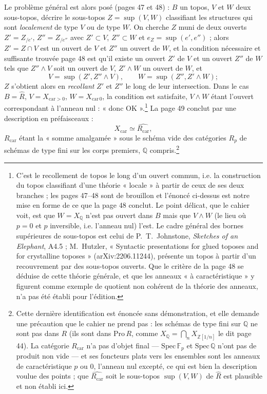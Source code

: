 \documentclass[11pt,a4paper]{article}
\begin{document}
Le problème général est alors posé (pages 47 et 48) : $B$ un topos, $V$ et
$W$ deux sous-topos, décrire le sous-topos $Z = \sup(V, W)$ classifiant les
structures qui sont \emph{localement} de type $V$ ou de type $W$. On
cherche $Z$ muni de deux ouverts $Z' = Z_{/e'}$, $Z'' = Z_{/e''}$ avec $Z' \subset
V$, $Z'' \subset W$ et $e_{Z} = \sup(e', e'')$ ; alors $Z' = Z \cap V$ est un
ouvert de $V$ et $Z''$ un ouvert de $W$, et la condition nécessaire et
suffisante trouvée page 48 est qu'il existe un ouvert $Z'$ de $V$ et un
ouvert $Z''$ de $W$ tels que $Z'' \wedge V$ soit un ouvert de $V$, $Z' \wedge
W$ un ouvert de $W$, et
\[
V = \sup(Z', Z'' \wedge V), \qquad W = \sup(Z'', Z' \wedge W) ;
\]
$Z$ s'obtient alors en \emph{recollant} $Z'$ et $Z''$ le long de leur
intersection. Dans le cas $B = \widehat{R}$, $V = X_{\mathrm{car} > 0}$, $W =
X_{\mathrm{car}\,0}$, la condition est satisfaite, $V \wedge W$ étant l'ouvert
correspondant à l'anneau nul : « donc OK ».\footnote{C'est le recollement
de topos le long d'un ouvert commun, i.e. la construction du topos
classifiant d'une théorie « locale » à partir de ceux de ses deux
branches ; les pages 47--48 sont de brouillon et l'énoncé ci-dessus est
notre mise en forme de ce que la page 48 conclut. Le point délicat, que
le cahier voit, est que $W = X_{\mathbb{Q}}$ n'est pas ouvert dans $B$ mais
que $V \wedge W$ (le lieu où $p = 0$ et $p$ inversible, i.e. l'anneau nul)
l'est. Le cadre général des bornes supérieures de sous-topos est celui de
P.~T.~Johnstone, \emph{Sketches of an Elephant}, A4.5 ; M.~Hutzler,
« Syntactic presentations for glued toposes and for crystalline toposes »
(arXiv:2206.11244), présente un topos à partir d'un recouvrement par des
sous-topos ouverts. Que le critère de la page 48 se déduise de cette théorie
générale, et que les anneaux « à caractéristique » y figurent comme exemple
de quotient non cohérent de la théorie des anneaux, n'a pas été établi pour
l'édition.} La page 49 conclut par une description en préfaisceaux :
\[
X_{\mathrm{car}} \simeq \widehat{R_{\mathrm{car}}},
\]
$R_{\mathrm{car}}$ étant la « somme amalgamée » sous le schéma vide des
catégories $R_{p}$ de schémas de type fini sur les corps premiers,
$\mathbb{Q}$ compris.\footnote{Cette dernière identification est énoncée
sans démonstration, et elle demande une précaution que le cahier ne prend
pas : les schémas de type fini sur $\mathbb{Q}$ ne sont pas dans $R$ (ils
sont dans $\mathrm{Pro}\,R$, comme $X_{\mathbb{Q}} = \bigcap_{n}
X_{\mathbb{Z}[1/n]}$ le dit page 44). La catégorie $R_{\mathrm{car}}$ n'a
pas d'objet final — $\mathrm{Spec}\,\mathbb{F}_{p}$ et $\mathrm{Spec}\,
\mathbb{Q}$ n'ont pas de produit non vide — et ses foncteurs plats vers
les ensembles sont les anneaux de caractéristique $p$ ou $0$, l'anneau nul
excepté, ce qui est bien la description voulue des points ; que
$\widehat{R_{\mathrm{car}}}$ soit le sous-topos $\sup(V, W)$ de
$\widehat{R}$ est plausible et non établi ici.}
\end{document}
